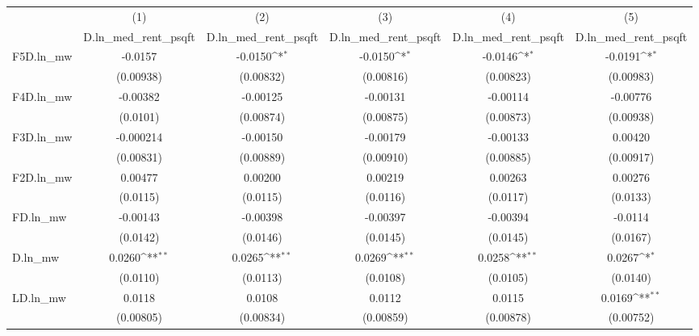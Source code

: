 {
\def\sym#1{\ifmmode^{#1}\else\(^{#1}\)\fi}
\begin{tabular}{l*{5}{c}}
\hline\hline
          &\multicolumn{1}{c}{(1)}&\multicolumn{1}{c}{(2)}&\multicolumn{1}{c}{(3)}&\multicolumn{1}{c}{(4)}&\multicolumn{1}{c}{(5)}\\
          &\multicolumn{1}{c}{D.ln\_med\_rent\_psqft}&\multicolumn{1}{c}{D.ln\_med\_rent\_psqft}&\multicolumn{1}{c}{D.ln\_med\_rent\_psqft}&\multicolumn{1}{c}{D.ln\_med\_rent\_psqft}&\multicolumn{1}{c}{D.ln\_med\_rent\_psqft}\\
\hline
F5D.ln\_mw &  -0.0157         &  -0.0150\sym{*}  &  -0.0150\sym{*}  &  -0.0146\sym{*}  &  -0.0191\sym{*}  \\
          &(0.00938)         &(0.00832)         &(0.00816)         &(0.00823)         &(0.00983)         \\
[1em]
F4D.ln\_mw & -0.00382         & -0.00125         & -0.00131         & -0.00114         & -0.00776         \\
          & (0.0101)         &(0.00874)         &(0.00875)         &(0.00873)         &(0.00938)         \\
[1em]
F3D.ln\_mw &-0.000214         & -0.00150         & -0.00179         & -0.00133         &  0.00420         \\
          &(0.00831)         &(0.00889)         &(0.00910)         &(0.00885)         &(0.00917)         \\
[1em]
F2D.ln\_mw &  0.00477         &  0.00200         &  0.00219         &  0.00263         &  0.00276         \\
          & (0.0115)         & (0.0115)         & (0.0116)         & (0.0117)         & (0.0133)         \\
[1em]
FD.ln\_mw  & -0.00143         & -0.00398         & -0.00397         & -0.00394         &  -0.0114         \\
          & (0.0142)         & (0.0146)         & (0.0145)         & (0.0145)         & (0.0167)         \\
[1em]
D.ln\_mw   &   0.0260\sym{**} &   0.0265\sym{**} &   0.0269\sym{**} &   0.0258\sym{**} &   0.0267\sym{*}  \\
          & (0.0110)         & (0.0113)         & (0.0108)         & (0.0105)         & (0.0140)         \\
[1em]
LD.ln\_mw  &   0.0118         &   0.0108         &   0.0112         &   0.0115         &   0.0169\sym{**} \\
          &(0.00805)         &(0.00834)         &(0.00859)         &(0.00878)         &(0.00752)         \\

\end{tabular}}
